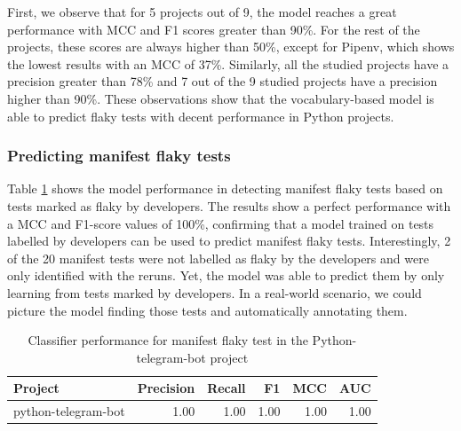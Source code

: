 First, we observe that for 5 projects out of 9, the model reaches a great performance with MCC and F1 scores greater than 90\%. 
For the rest of the projects, these scores are always higher than 50\%, except for Pipenv, which shows the lowest results with an MCC of 37\%.
Similarly, all the studied projects have a precision greater than 78\% and 7 out of the 9 studied projects have a precision higher than 90\%.
These observations show that the vocabulary-based model is able to predict flaky tests with decent performance in Python projects.

\subsubsection{Predicting manifest flaky tests}

Table \ref{pythonManifestResults} shows the model performance in detecting manifest flaky tests based on tests marked as flaky by developers.
The results show a perfect performance with a MCC and F1-score values of 100\%, confirming that a model trained on tests labelled by developers can be used to predict manifest flaky tests.
Interestingly, 2 of the 20 manifest tests were not labelled as flaky by the developers and were only identified with the reruns.
Yet, the model was able to predict them by only learning from tests marked by developers.
In a real-world scenario, we could picture the model finding those tests and automatically annotating them.

\begin{table}[t!]
\vspace{1.0em}
\caption{Classifier performance for manifest flaky test in the Python-telegram-bot project}
\label{pythonManifestResults}
\centering
 \begin{tabular}{l|r r r r r} 
 \hline
 \textbf{Project} & \textbf{Precision} & \textbf{Recall} & \textbf{F1} & \textbf{MCC} & \textbf{AUC} \\ [0.25ex]
 \hline
 python-telegram-bot & 1.00 & 1.00 & 1.00 & 1.00 & 1.00 \\ 
 \hline
\end{tabular}
\vspace{1.0em}
\end{table}

